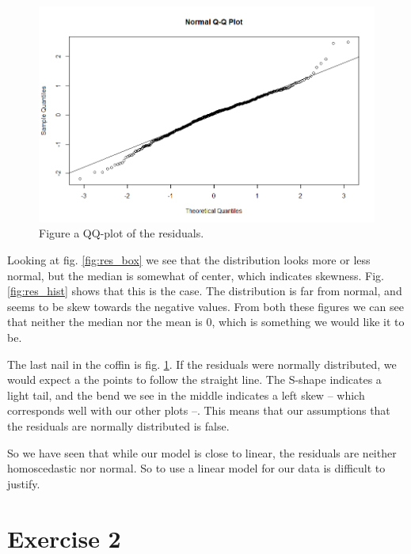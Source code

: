\documentclass[a4paper,norsk, 10pt]{article}
\begin{document}
\begin{figure}[!htbp]
\centering
\includegraphics[scale=0.5]{res_qq.png}
\caption{Figure a QQ-plot of the residuals.}\label{fig:res_qq}
\end{figure}


Looking at fig. \ref{fig:res_box} we see that the distribution looks more or less normal, but the median is somewhat of center, which indicates skewness. Fig. \ref{fig:res_hist} shows that this is the case. The distribution is far from normal, and seems to be skew towards the negative values. From both these figures we can see that neither the median nor the mean is $0$, which is something we would like it to be.

The last nail in the coffin is fig. \ref{fig:res_qq}. If the residuals were normally distributed, we would expect a the points to follow the straight line. The S-shape indicates a light tail, and the bend we see in the middle indicates a left skew -- which corresponds well with our other plots --. This means that our assumptions that the residuals are normally distributed is false.


So we have seen that while our model is close to linear, the residuals are neither homoscedastic nor normal. So to use a linear model for our data is difficult to justify.












\section*{Exercise 2}
\end{document}
